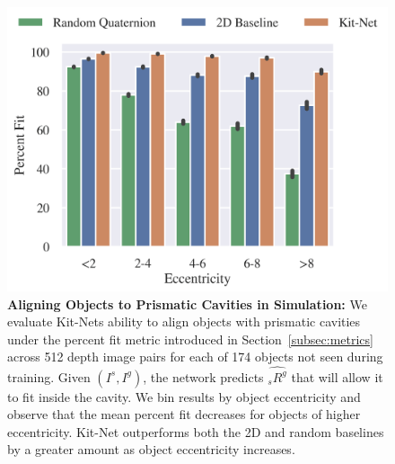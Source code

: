\begin{figure}[t]
  \centering
  \vspace{8pt}
  \includegraphics[width=\linewidth]{figures/percent_fit_ecc_v4.png}
  \caption{\textbf{Aligning Objects to Prismatic Cavities in Simulation: }We evaluate Kit-Nets ability to align objects with prismatic cavities under the percent fit metric introduced in Section~\ref{subsec:metrics} across 512 depth image pairs for each of 174 objects not seen during training. Given $(I^s,I^g)$, the network predicts $\hat{{_s}R^g}$ that will allow it to fit inside the cavity. We bin results by object eccentricity and observe that the mean percent fit decreases for objects of higher eccentricity. Kit-Net outperforms both the 2D and random baselines by a greater amount as object eccentricity increases.}
  \label{fig:mean-percent-fit-ecc}
\end{figure}


